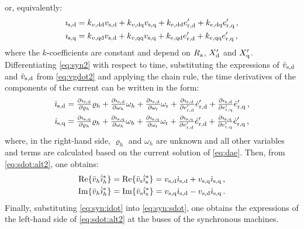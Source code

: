 \documentclass[journal, twocolumn, letter]{IEEEtran}
\renewcommand{\Re}{{\rm Re}}
\renewcommand{\Im}{{\rm Im}}
\newcommand{\dx}[1]{#1_{\rm d}}
\newcommand{\qx}[1]{#1_{\rm q}}
\newcommand{\ds}[1]{#1_{\rm s, d}}
\newcommand{\qs}[1]{#1_{\rm s, q}}
\newcommand{\dr}[1]{#1_{\rm r, d}}
\newcommand{\qr}[1]{#1_{\rm r, q}}
\newcommand{\wg}{\omega_{\rm r}}
\newcommand{\vg}{\bar{v}_{\rm s}}
\newcommand{\igdot}{\dot{\bar{\ii}}_{\rm s}}
\newcommand{\vhbar}{\bar{v}_h}
\newcommand{\rhoh}{\varrho_h}
\newcommand{\wh}{\omega_h}
\newcommand{\pd}[1]{\tfrac{\partial \ii_{\rm s, d}}{\partial #1}}
\newcommand{\pq}[1]{\tfrac{\partial \ii_{\rm s, q}}{\partial #1}}
\newcommand{\ii}{\imath}
\newcommand{\ihdot}{\dot{\bar{\ii}}_{h}}
\begin{document}
or, equivalently:
\begin{equation}
  \label{eq:syn2}
  \begin{aligned}
    \ds{\ii} &= k_{v, \rm dd} \ds{v} + k_{v, \rm dq} \qs{v} +
    k_{e, \rm dd} \dr{e'} + k_{e, \rm dq} \qr{e'} \, , \\
    \qs{\ii} &= k_{v, \rm qd} \ds{v} + k_{v, \rm qq} \qs{v} +
    k_{e, \rm qd} \dr{e'} + k_{e, \rm qq} \qr{e'} \, ,
  \end{aligned}
\end{equation}
where the $k$-coefficients are constant and depend on $R_{\rm a}$,
$\dx{X}'$ and $\qx{X}'$.
Differentiating \eqref{eq:syn2} with respect to time, substituting the
expressions of $\ds{\dot{v}}$ and $\ds{\dot{v}}$ from
\eqref{eq:vgdot2} and applying the chain rule, the time derivatives of
the components of the current can be written in the form:
\begin{equation}
  \label{eq:syn:idot}
  \begin{aligned}
    \ds{\dot{\ii}} &=  \pd{\rhoh} \rhoh + \pd{\wh} \wh + \pd{\wg} \wg + 
    \pd{\dr{e}'} \dr{\dot{e}'} + \pd{\qr{e}'} \qr{\dot{e}'} \, , \\
\qs{\dot{\ii}} &= \pq{\rhoh} \rhoh + \pq{\wh} \wh +  \pq{\wg} \wg + 
    \pq{\dr{e}'} \dr{\dot{e}'} + \pq{\qr{e}'} \qr{\dot{e}'} \, ,
\end{aligned}
\end{equation}
where, in the right-hand side, $\rhoh$ and $\wh$ are unknown and all
other variables and terms are calculated based on the current solution
of \eqref{eq:dae}.
Then, from \eqref{eq:sdot:alt2}, one obtains:
\begin{equation}
  \label{eq:syn:sdot}
  \begin{aligned}
    \Re \{ \vhbar \ihdot^* \} &= \Re \{ \vg \igdot^* \} =
    \ds{v} \ds{\dot{\ii}} + \qs{v} \qs{\dot{\ii}} \, , \\
    \Im \{ \vhbar \ihdot^* \} &= \Im \{ \vg \igdot^* \} =
    \qs{v} \ds{\dot{\ii}} - \ds{v} \qs{\dot{\ii}} \, .
  \end{aligned}
\end{equation}
Finally, substituting \eqref{eq:syn:idot} into \eqref{eq:syn:sdot},
one obtains the expressions of the left-hand side of
\eqref{eq:sdot:alt2} at the buses of the synchronous machines.
\end{document}
